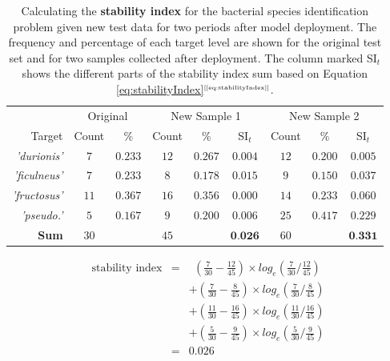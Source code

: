 \documentclass[xcolor={table}]{beamer}
\newcommand{\indexkeyword}[1]{\alert{\textbf{#1}\index{#1}}}
\newcommand{\featL}[1]{\textit{'#1'}}
\newcommand{\ourEqRef}[1]{\eqref{#1}$^{\text{\tiny[\pageref{#1}]}}$}
\begin{document}
 \begin{frame} [plain]
\begin{table}
	\caption{Calculating the \indexkeyword{stability index} for the bacterial species identification problem given new test data for two periods after model deployment. The frequency and percentage of each target level are shown for the original test set and for two samples collected after deployment. The column marked SI$_t$ shows the different parts of the stability index sum based on Equation \ourEqRef{eq:stabilityIndex}.}
\label{tab:stabilityIndexExample}
\centering
	\begin{scriptsize}
		\begin{tabular}[ht]{r c c c c c c c c}  
				\hline
	&	\multicolumn{2}{c}{Original}		&	\multicolumn{3}{c}{New Sample 1}		&	\multicolumn{3}{c}{New Sample 2}	\\
Target & Count	&	\%	&	Count	&	\%	&	SI$_t$	&	Count	&	\%	&	SI$_t$	\\
				\hline
\featL{durionis}	&	$7$	&	$0.233$	&	$12$	&	$0.267$	&	$0.004$	&	$12$	&	$0.200$	&	$0.005$	\\
\featL{ficulneus}	&	$7$	&	$0.233$	&	$8$	&	$0.178$	&	$0.015$	&	$9$	&	$0.150$	&	$0.037$	\\
\featL{fructosus}	&	$11$	&	$0.367$	&	$16$	&	$0.356$	&	$0.000$	&	$14$	&	$0.233$	&	$0.060$	\\
\featL{pseudo.}	&	$5$	&	$0.167$	&	$9$	&	$0.200$	&	$0.006$	&	$25$	&	$0.417$	&	$0.229$	\\
				\hline
\textbf{Sum}	&	$30$	&		&	$45$	&		&	$\textbf{0.026}$ 	&	$60$	&		&	$\textbf{0.331}$	\\
				\hline
			\end{tabular}
			\end{scriptsize}
\end{table}
\end{frame} 



 \begin{frame} 
\begin{eqnarray*}
\text{stability index} & = & ~~\left(\frac{7}{30} - \frac{12}{45}\right) \times log_e\left( \frac{7}{30} /  \frac{12}{45}\right) \\
&  & + \left(\frac{7}{30} - \frac{8}{45}\right) \times log_e\left( \frac{7}{30} /  \frac{8}{45}\right) \\
&  & + \left(\frac{11}{30} - \frac{16}{45}\right) \times log_e\left( \frac{11}{30} /  \frac{16}{45}\right) \\
&  & + \left(\frac{5}{30} - \frac{9}{45}\right) \times log_e\left( \frac{5}{30} /  \frac{9}{45}\right) \\
& = & 0.026
\end{eqnarray*}
\end{frame} 
\end{document}
